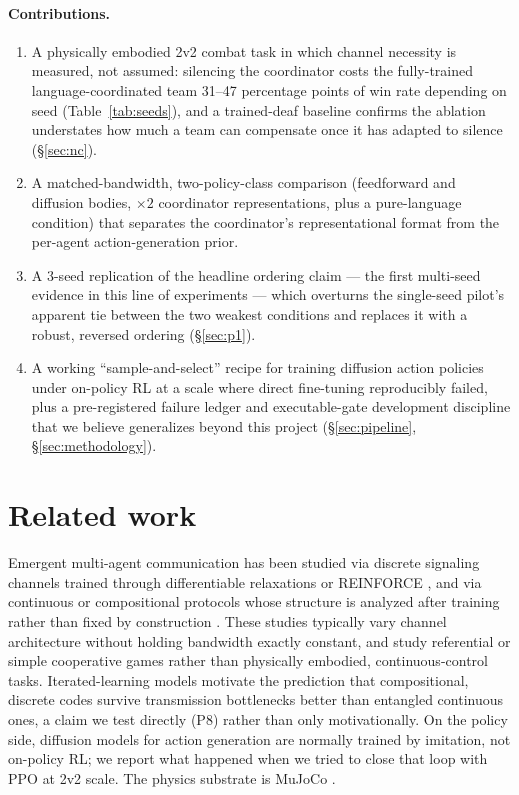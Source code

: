 \documentclass[11pt]{article}
\begin{document}
\paragraph{Contributions.}
\begin{enumerate}
\item A physically embodied 2v2 combat task in which channel necessity is
  measured, not assumed: silencing the coordinator costs the
  fully-trained language-coordinated team 31--47 percentage points of
  win rate depending on seed (Table~\ref{tab:seeds}), and a trained-deaf
  baseline confirms the ablation understates how much a team can
  compensate once it has adapted to silence (\S\ref{sec:nc}).
\item A matched-bandwidth, two-policy-class comparison (feedforward and
  diffusion bodies, $\times 2$ coordinator representations, plus a
  pure-language condition) that separates the coordinator's
  representational format from the per-agent action-generation prior.
\item A 3-seed replication of the headline ordering claim --- the first
  multi-seed evidence in this line of experiments --- which overturns the
  single-seed pilot's apparent tie between the two weakest conditions
  and replaces it with a robust, reversed ordering (\S\ref{sec:p1}).
\item A working ``sample-and-select'' recipe for training diffusion
  action policies under on-policy RL at a scale where direct fine-tuning
  reproducibly failed, plus a pre-registered failure ledger and
  executable-gate development discipline that we believe generalizes
  beyond this project (\S\ref{sec:pipeline}, \S\ref{sec:methodology}).
\end{enumerate}

\section{Related work}

Emergent multi-agent communication has been studied via discrete
signaling channels trained through differentiable relaxations or
REINFORCE \citep{foerster2016,lazaridou2017}, and via continuous or
compositional protocols whose structure is analyzed after training
rather than fixed by construction \citep{mordatch2018,chaabouni2020}.
These studies typically vary channel architecture without holding
bandwidth exactly constant, and study referential or simple cooperative
games rather than physically embodied, continuous-control tasks.
Iterated-learning models \citep{kirby2001,skyrms2010} motivate the
prediction that compositional, discrete codes survive transmission
bottlenecks better than entangled continuous ones, a claim we test
directly (P8) rather than only motivationally. On the policy side,
diffusion models for action generation
\citep{ho2020,janner2022,chi2023} are normally trained by imitation,
not on-policy RL; we report what happened when we tried to close that
loop with PPO \citep{schulman2017} at 2v2 scale. The physics substrate
is MuJoCo \citep{todorov2012}.
\end{document}

